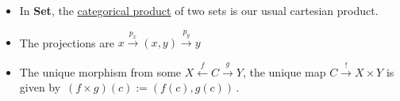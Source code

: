 \begin{itemize}
    \item  In \textbf{Set}, the \hyperref[D3.86]{categorical product} of two sets is our usual cartesian product.
    \item The projections are $x \xrightarrow{p_x}(x,y)\xrightarrow{p_y}y$
    \item The unique morphism from some $X \xleftarrow{f} C \xrightarrow{g} Y$, the unique map $C \xrightarrow{!}X \times Y$ is given by \,$(f\times g)(c):=(f(c),g(c))$\,.
  \end{itemize}

